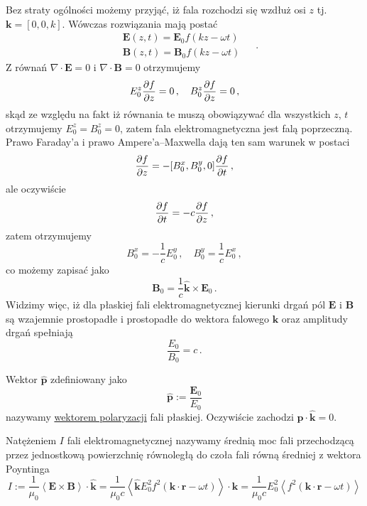 \documentclass[../main.tex]{subfiles}
\begin{document}
Bez straty ogólności możemy przyjąć, iż fala rozchodzi się wzdłuż osi \(z\) tj. \(\mathbf{k}=[0,0,k]\). Wówczas rozwiązania mają postać
\begin{equation*}
\begin{split}
    &\mathbf{E}(z,t)=\mathbf{E}_0f(kz-\omega t)\\
    &\mathbf{B}(z,t)=\mathbf{B}_0f(kz-\omega t)
\end{split}\quad\,.
\end{equation*}
Z równań \(\nabla\cdot\mathbf{E}=0\) i \(\nabla\cdot\mathbf{B}=0\) otrzymujemy
\begin{equation*}
    E_0^z\pdv{f}{z}=0\,,\quad B_0^z\pdv{f}{z}=0\,,
\end{equation*}
skąd ze względu na fakt iż równania te muszą obowiązywać dla wszystkich \(z\), \(t\) otrzymujemy \(E_0^z=B_0^z=0\), zatem fala elektromagnetyczna jest falą poprzeczną. Prawo Faraday'a i prawo Ampere'a--Maxwella dają ten sam warunek w postaci
\begin{equation*}
    [-E_0^y,E_0^x,0]\pdv{f}{z}=-[B_0^x,B_0^y,0]\pdv{f}{t}\,,
\end{equation*}
ale oczywiście
\begin{equation*}
    \pdv{f}{t}=-c\pdv{f}{z}\,,
\end{equation*}
zatem otrzymujemy
\begin{equation*}
    B_0^x=-\frac{1}{c}E_0^y\,,\quad B_0^y=\frac{1}{c}E_0^x\,,
\end{equation*}
co możemy zapisać jako
\begin{equation*}
    \mathbf{B}_0=\frac{1}{c}\mathbf{\hat{k}}\times\mathbf{E}_0\,.
\end{equation*}
Widzimy więc, iż dla płaskiej fali elektromagnetycznej kierunki drgań pól \(\mathbf{E}\) i \(\mathbf{B}\) są wzajemnie prostopadłe i prostopadłe do wektora falowego \(\mathbf{k}\) oraz amplitudy drgań spełniają
\begin{equation*}
    \frac{E_0}{B_0}=c\,.
\end{equation*}
\medskip

Wektor \(\mathbf{\hat{p}}\) zdefiniowany jako
\begin{equation*}
    \mathbf{\hat{p}}:=\frac{\mathbf{E}_0}{E_0}
\end{equation*}
nazywamy \underline{wektorem polaryzacji} fali płaskiej. Oczywiście zachodzi \(\mathbf{\hat{p}}\cdot\mathbf{\hat{k}}=0\).
\medskip

Natężeniem \(I\) fali elektromagnetycznej nazywamy średnią moc fali przechodzącą przez jednostkową powierzchnię równoległą do czoła fali równą średniej z wektora Poyntinga
\begin{equation*}
    I:=\frac{1}{\mu_0}\left\langle\mathbf{E}\times\mathbf{B}\right\rangle\cdot\mathbf{\hat{k}}=\frac{1}{\mu_0 c}\left\langle\mathbf{\hat{k}}E_0^2f^2(\mathbf{k}\cdot\mathbf{r}-\omega t)\right\rangle\cdot\mathbf{\hat{k}}=\frac{1}{\mu_0 c}E_0^2\left\langle f^2(\mathbf{k}\cdot\mathbf{r}-\omega t)\right\rangle
\end{equation*}
\end{document}
